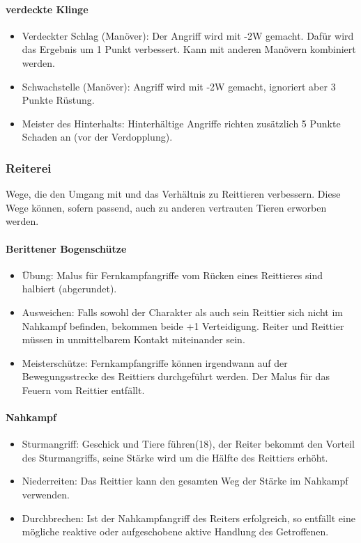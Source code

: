 \documentclass{article}
\begin{document}
\paragraph{verdeckte Klinge}

\begin{itemize}
\item Verdeckter Schlag (Manöver): Der Angriff wird mit -2W gemacht. Dafür wird das Ergebnis um 1 Punkt verbessert. Kann mit anderen Manövern kombiniert werden.
\item Schwachstelle (Manöver): Angriff wird mit -2W gemacht, ignoriert aber 3 Punkte Rüstung.
\item Meister des Hinterhalts: Hinterhältige Angriffe richten zusätzlich 5 Punkte Schaden an (vor der Verdopplung).
\end{itemize}

\subsubsection{Reiterei}

Wege, die den Umgang mit und das Verhältnis zu Reittieren verbessern. Diese Wege können, sofern passend, auch zu
anderen vertrauten Tieren erworben werden.

\paragraph{Berittener Bogenschütze}

\begin{itemize}
\item Übung: Malus für Fernkampfangriffe vom Rücken eines Reittieres sind halbiert (abgerundet).
\item Ausweichen: Falls sowohl der Charakter als auch sein Reittier sich nicht im Nahkampf befinden, bekommen beide +1 Verteidigung. Reiter und Reittier müssen in unmittelbarem Kontakt miteinander sein.
\item Meisterschütze: Fernkampfangriffe können irgendwann auf der Bewegungsstrecke des Reittiers durchgeführt werden. Der Malus für das Feuern vom Reittier entfällt.
\end{itemize}

\paragraph{Nahkampf}

\begin{itemize}
\item Sturmangriff: Geschick und Tiere führen(18), der Reiter bekommt den Vorteil des Sturmangriffs, seine Stärke wird um die Hälfte des Reittiers erhöht.
\item Niederreiten: Das Reittier kann den gesamten Weg der Stärke im Nahkampf verwenden.
\item Durchbrechen: Ist der Nahkampfangriff des Reiters erfolgreich, so entfällt eine mögliche reaktive oder aufgeschobene aktive Handlung des Getroffenen.
\end{itemize}
\end{document}
